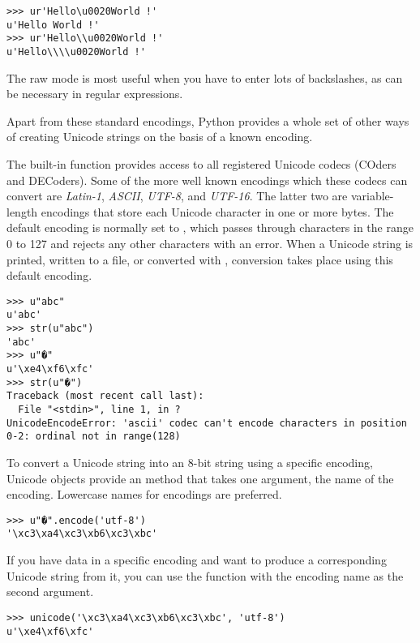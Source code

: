 \documentclass{manual}
\begin{document}
\begin{verbatim}
>>> ur'Hello\u0020World !'
u'Hello World !'
>>> ur'Hello\\u0020World !'
u'Hello\\\\u0020World !'
\end{verbatim}

The raw mode is most useful when you have to enter lots of
backslashes, as can be necessary in regular expressions.

Apart from these standard encodings, Python provides a whole set of
other ways of creating Unicode strings on the basis of a known
encoding. 

The built-in function  provides
access to all registered Unicode codecs (COders and DECoders). Some of
the more well known encodings which these codecs can convert are
\emph{Latin-1}, \emph{ASCII}, \emph{UTF-8}, and \emph{UTF-16}.
The latter two are variable-length encodings that store each Unicode
character in one or more bytes. The default encoding is
normally set to \ASCII, which passes through characters in the range
0 to 127 and rejects any other characters with an error.
When a Unicode string is printed, written to a file, or converted
with , conversion takes place using this default encoding.

\begin{verbatim}
>>> u"abc"
u'abc'
>>> str(u"abc")
'abc'
>>> u"�"
u'\xe4\xf6\xfc'
>>> str(u"�")
Traceback (most recent call last):
  File "<stdin>", line 1, in ?
UnicodeEncodeError: 'ascii' codec can't encode characters in position 0-2: ordinal not in range(128)
\end{verbatim}

To convert a Unicode string into an 8-bit string using a specific
encoding, Unicode objects provide an  method
that takes one argument, the name of the encoding.  Lowercase names
for encodings are preferred.

\begin{verbatim}
>>> u"�".encode('utf-8')
'\xc3\xa4\xc3\xb6\xc3\xbc'
\end{verbatim}

If you have data in a specific encoding and want to produce a
corresponding Unicode string from it, you can use the
 function with the encoding name as the second
argument.

\begin{verbatim}
>>> unicode('\xc3\xa4\xc3\xb6\xc3\xbc', 'utf-8')
u'\xe4\xf6\xfc'
\end{verbatim}
\end{document}
